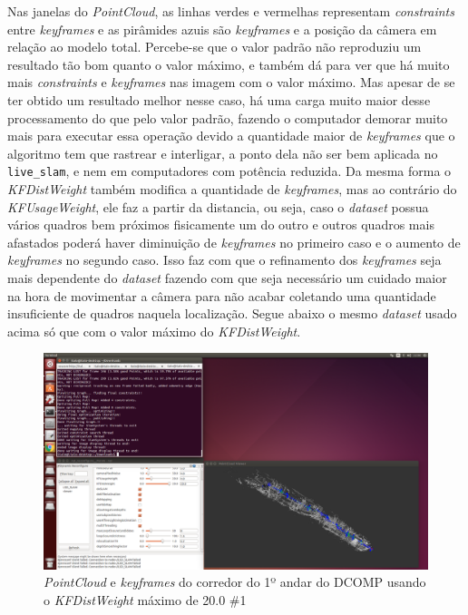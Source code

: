 Nas janelas do \textit{PointCloud}, as linhas verdes e vermelhas representam \textit{constraints} entre \textit{keyframes} e as pirâmides azuis são \textit{keyframes} e a posição da câmera em relação ao modelo total. Percebe-se que o valor padrão não reproduziu um resultado tão bom quanto o valor máximo, e também dá para ver que há muito mais \textit{constraints} e \textit{keyframes} nas imagem com o valor máximo. Mas apesar de se ter obtido um resultado melhor nesse caso, há uma carga muito maior desse processamento do que pelo valor padrão, fazendo o computador demorar muito mais para executar essa operação devido a quantidade maior de \textit{keyframes} que o algoritmo tem que rastrear e interligar, a ponto dela não ser bem aplicada no \texttt{live\_slam}, e nem em computadores com potência reduzida. Da mesma forma o \textit{KFDistWeight} também modifica a quantidade de \textit{keyframes}, mas ao contrário do \textit{KFUsageWeight}, ele faz a partir da distancia, ou seja, caso o \textit{dataset} possua vários quadros bem próximos fisicamente um do outro e outros quadros mais afastados poderá haver diminuição de \textit{keyframes} no primeiro caso e o aumento de \textit{keyframes} no segundo caso. Isso faz com que o refinamento dos \textit{keyframes} seja mais dependente do \textit{dataset} fazendo com que seja necessário um cuidado maior na hora de movimentar a câmera para não acabar coletando uma quantidade insuficiente de quadros naquela localização. Segue abaixo o mesmo \textit{dataset} usado acima só que com o valor máximo do \textit{KFDistWeight}.

\begin{figure}[!htb]
	\centering
		\includegraphics[width= \textwidth]{Imagens/figura3-38.png}
	\caption{\textit{PointCloud} e \textit{keyframes} do corredor do 1º andar do DCOMP usando o \textit{KFDistWeight} máximo de 20.0 \#1}
	\label{fig3:36}
\end{figure}

